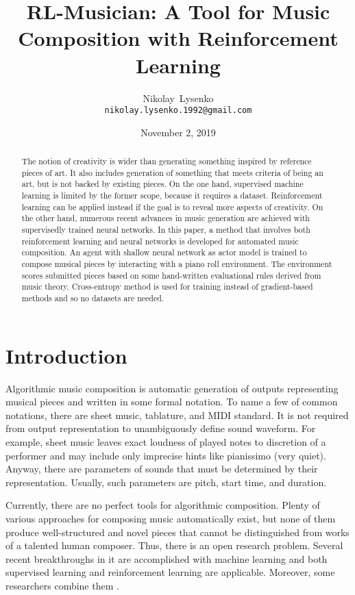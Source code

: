 \documentclass{article}
\title{RL-Musician: A Tool for Music Composition with Reinforcement Learning}
\date{November 2, 2019}
\author{
  Nikolay~Lysenko\\
  \texttt{nikolay.lysenko.1992@gmail.com} \\
}
\begin{document}
\maketitle

\begin{abstract}
The notion of creativity is wider than generating something inspired by reference pieces of art. It also includes generation of something that meets criteria of being an art, but is not backed by existing pieces. On the one hand, supervised machine learning is limited by the former scope, because it requires a dataset. Reinforcement learning can be applied instead if the goal is to reveal more aspects of creativity. On the other hand, numerous recent advances in music generation are achieved with supervisedly trained neural networks. In this paper, a method that involves both reinforcement learning and neural networks is developed for automated music composition. An agent with shallow neural network as actor model is trained to compose musical pieces by interacting with a piano roll environment. The environment scores submitted pieces based on some hand-written evaluational rules derived from music theory. Cross-entropy method is used for training instead of gradient-based methods and so no datasets are needed.
\end{abstract}



\section{Introduction}
\label{sec:introduction}

Algorithmic music composition is automatic generation of outputs representing musical pieces and written in some formal notation. To name a few of common notations, there are sheet music, tablature, and MIDI standard. It is not required from output representation to unambiguously define sound waveform. For example, sheet music leaves exact loudness of played notes to discretion of a performer and may include only imprecise hints like pianissimo (very quiet). Anyway, there are parameters of sounds that must be determined by their representation. Usually, such parameters are pitch, start time, and duration.

Currently, there are no perfect tools for algorithmic composition. Plenty of various approaches for composing music automatically exist, but none of them produce well-structured and novel pieces that cannot be distinguished from works of a talented human composer. Thus, there is an open research problem. Several recent breakthroughs in it are accomplished with machine learning and both supervised learning \cite{johnson2017generating, payne2019musenet} and reinforcement learning \cite{smith2012reinforcement} are applicable. Moreover, some researchers combine them \cite{jaques2016generating, kotecha2018bach, kumar2019polyphonic}.
\end{document}
